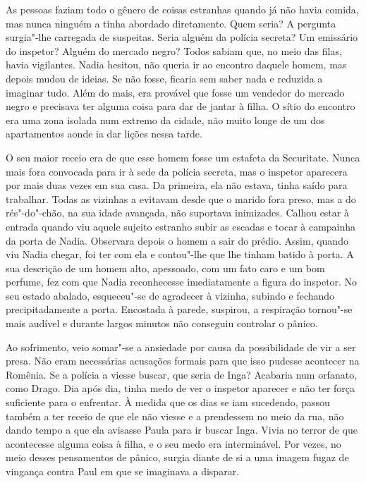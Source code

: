 As pessoas faziam todo o gênero de coisas estranhas quando já não havia
comida, mas nunca ninguém a tinha abordado diretamente. Quem seria? A
pergunta surgia"-lhe carregada de suspeitas. Seria alguém da polícia secreta? Um
emissário do inspetor? Alguém do mercado
negro? Todos sabiam que, no meio das filas, havia vigilantes. Nadia
hesitou, não queria ir ao encontro daquele homem, mas depois mudou de
ideias. Se não fosse, ficaria sem saber nada e reduzida a imaginar tudo.
Além do mais, era provável que fosse um vendedor do mercado negro e
precisava ter alguma coisa para dar de jantar à filha. O sítio do
encontro era uma zona isolada num extremo da cidade, não muito longe de
um dos apartamentos aonde ia dar lições nessa tarde.

O seu maior receio era de que esse homem fosse um estafeta da
Securitate. Nunca mais fora convocada para ir à sede da polícia secreta,
mas o inspetor aparecera por mais duas vezes em sua casa. Da primeira,
ela não estava, tinha saído para trabalhar. Todas as vizinhas a evitavam
desde que o marido fora preso, mas a do rés"-do"-chão, na sua idade
avançada, não suportava inimizades. Calhou estar à entrada quando viu
aquele sujeito estranho subir as escadas e tocar à campainha da porta de
Nadia. Observara depois o homem a sair do prédio. Assim, quando viu
Nadia chegar, foi ter com ela e contou"-lhe que lhe tinham batido à
porta. A sua descrição de um homem alto, apessoado, com um fato caro e
um bom perfume, fez com que Nadia reconhecesse imediatamente a figura do
inspetor. No seu estado abalado, esqueceu"-se de agradecer à vizinha,
subindo e fechando precipitadamente a porta. Encostada à parede,
suspirou, a respiração tornou"-se mais audível e durante largos minutos
não conseguiu controlar o pânico.

Ao sofrimento, veio somar"-se a
ansiedade por causa da possibilidade de vir a ser presa. Não eram
necessárias acusações formais para que isso pudesse acontecer na
Romênia. Se a polícia a viesse buscar, que seria de Inga? Acabaria num
orfanato, como Drago. Dia após dia, tinha medo de ver o inspetor
aparecer e não ter força suficiente para o enfrentar. À medida que os
dias se iam sucedendo, passou também a ter receio de que ele não viesse
e a prendessem no meio da rua, não dando tempo a que ela avisasse
Paula para ir buscar Inga. Vivia no terror de que acontecesse alguma
coisa à filha, e o seu medo era interminável. Por vezes, no meio
desses pensamentos de pânico, surgia diante de si a uma imagem fugaz de
vingança contra Paul em que se imaginava a disparar.

